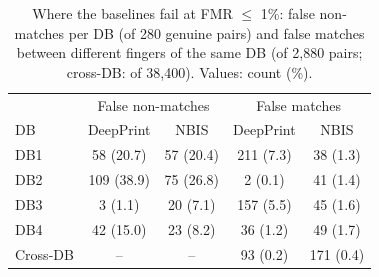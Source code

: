 \begin{table}[!htb]
\centering
\caption{Where the baselines fail at FMR $\le$ 1\%: false non-matches per DB (of 280 genuine pairs) and false matches between different fingers of the same DB (of 2,880 pairs; cross-DB: of 38,400). Values: count (\%).}
\label{tab:s4-errors}
\footnotesize
\setlength{\tabcolsep}{2.5pt}
\begin{tabular}{lcccc}
\hline
 & \multicolumn{2}{c}{False non-matches} & \multicolumn{2}{c}{False matches} \\
DB & DeepPrint & NBIS & DeepPrint & NBIS \\
\hline
DB1 & 58 (20.7) & 57 (20.4) & 211 (7.3) & 38 (1.3) \\
DB2 & 109 (38.9) & 75 (26.8) & 2 (0.1) & 41 (1.4) \\
DB3 & 3 (1.1) & 20 (7.1) & 157 (5.5) & 45 (1.6) \\
DB4 & 42 (15.0) & 23 (8.2) & 36 (1.2) & 49 (1.7) \\
Cross-DB & -- & -- & 93 (0.2) & 171 (0.4) \\
\hline
\end{tabular}
\end{table}
